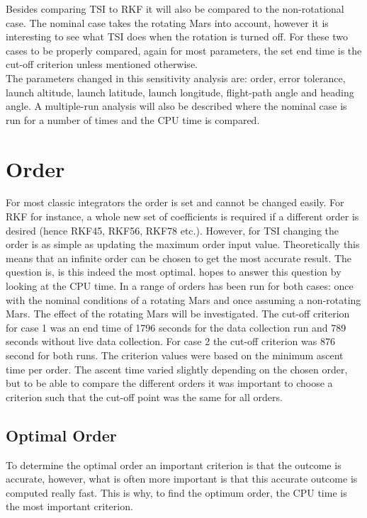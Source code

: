 \noindent
Besides comparing \ac{TSI} to \ac{RKF} it will also be compared to the non-rotational case. The nominal case takes the rotating Mars into account, however it is interesting to see what \ac{TSI} does when the rotation is turned off. For these two cases to be properly compared, again for most parameters, the set end time is the cut-off criterion unless mentioned otherwise.\\

\noindent
The parameters changed in this sensitivity analysis are: order, error tolerance, launch altitude, launch latitude, launch longitude, flight-path angle and heading angle. A multiple-run analysis will also be described where the nominal case is run for a number of times and the CPU time is compared. 


\section{Order}
\label{sec:order}
For most classic integrators the order is set and cannot be changed easily. For \ac{RKF} for instance, a whole new set of coefficients is required if a different order is desired (hence \ac{RKF45}, \ac{RKF56}, \ac{RKF78} etc.). However, for \ac{TSI} changing the order is as simple as updating the maximum order input value. Theoretically this means that an infinite order can be chosen to get the most accurate result. The question is, is this indeed the most optimal.  hopes to answer this question by looking at the CPU time. In  a range of orders has been run for both cases: once with the nominal conditions of a rotating Mars and once assuming a non-rotating Mars. The effect of the rotating Mars will be investigated. The cut-off criterion for case 1 was an end time of 1796 seconds for the data collection run and 789 seconds without live data collection. For case 2 the cut-off criterion was 876 second for both runs. The criterion values were based on the minimum ascent time per order. The ascent time varied slightly depending on the chosen order, but to be able to compare the different orders it was important to choose a criterion such that the cut-off point was the same for all orders.

\subsection{Optimal Order}
\label{subsec:optimalOrder}
To determine the optimal order an important criterion is that the outcome is accurate, however, what is often more important is that this accurate outcome is computed really fast. This is why, to find the optimum order, the CPU time is the most important criterion. 

